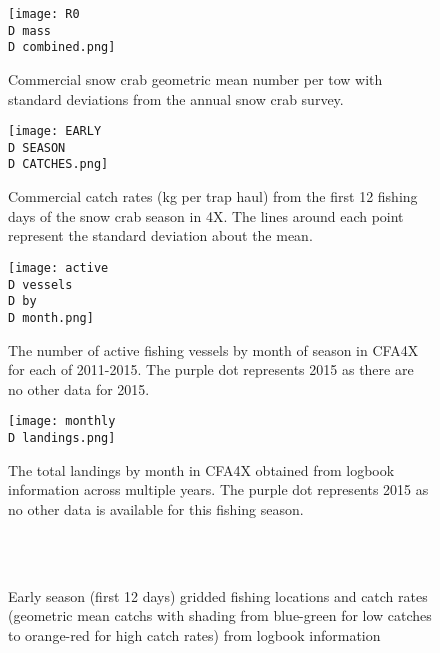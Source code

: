 \documentclass[paper=a4, fontsize=11pt]{article}
\newcommand{\D}{.}
\numberwithin{equation}{section}
\numberwithin{figure}{section}
\numberwithin{table}{section}
\begin{document}
\begin{figure}
\centering
	\texttt{[image: R0\\D mass\\D combined.png]}
	\caption{Commercial snow crab geometric mean number per tow with standard deviations from the annual snow crab survey.}

\end{figure}


\begin{figure}
	\centering
	\texttt{[image: EARLY\\D SEASON\\D CATCHES.png]}
	\caption{Commercial catch rates (kg per trap haul) from the first 12 fishing days of the snow crab season in 4X. The lines around each point represent the standard deviation about the mean.}
\end{figure}

\begin{figure}
	\centering
	\texttt{[image: active\\D vessels\\D by\\D month.png]}
	\caption{The number of active fishing vessels by month of season in CFA4X for each of 2011-2015. The purple dot represents 2015 as there are no other data for 2015.}
\end{figure}

\begin{figure}
	\centering
	\texttt{[image: monthly\\D landings.png]}
	\caption{The total landings by month in CFA4X obtained from logbook information across multiple years. The purple dot represents 2015 as no other data is available for this fishing season.}
\end{figure}

\begin{figure}
   \centering
  	\\
  	\\

	\caption{Early season (first 12 days) gridded fishing locations and catch rates (geometric mean catchs with shading from blue-green for low catches to orange-red for high catch rates) from logbook information}

\end{figure}
\clearpage
\end{document}
